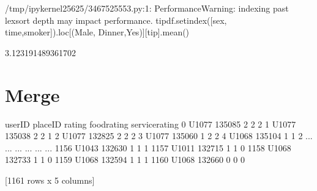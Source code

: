 \documentclass[letterpaper,10pt,english]{jupyterBook}
\begin{document}
\begin{sphinxVerbatim}[commandchars=\\\{\}]
/tmp/ipykernel\PYGZus{}25625/3467525553.py:1: PerformanceWarning: indexing past lexsort depth may impact performance.
  tip\PYGZus{}df.set\PYGZus{}index([\PYGZsq{}sex\PYGZsq{}, \PYGZsq{}time\PYGZsq{},\PYGZsq{}smoker\PYGZsq{}]).loc[(\PYGZsq{}Male\PYGZsq{}, \PYGZsq{}Dinner\PYGZsq{},\PYGZsq{}Yes\PYGZsq{})][\PYGZsq{}tip\PYGZsq{}].mean()
\end{sphinxVerbatim}

\begin{sphinxVerbatim}[commandchars=\\\{\}]
3.123191489361702
\end{sphinxVerbatim}


\chapter{Merge}
\label{\detokenize{c3_data_preprocessing/merge:merge}}\label{\detokenize{c3_data_preprocessing/merge::doc}}
\sphinxAtStartPar
{}

\begin{sphinxVerbatim}[commandchars=\\\{\}]
   
\end{sphinxVerbatim}

\begin{sphinxVerbatim}[commandchars=\\\{\}]
  
\end{sphinxVerbatim}

\begin{sphinxVerbatim}[commandchars=\\\{\}]
\end{sphinxVerbatim}

\begin{sphinxVerbatim}[commandchars=\\\{\}]
     userID  placeID  rating  food\PYGZus{}rating  service\PYGZus{}rating
0     U1077   135085       2            2               2
1     U1077   135038       2            2               1
2     U1077   132825       2            2               2
3     U1077   135060       1            2               2
4     U1068   135104       1            1               2
...     ...      ...     ...          ...             ...
1156  U1043   132630       1            1               1
1157  U1011   132715       1            1               0
1158  U1068   132733       1            1               0
1159  U1068   132594       1            1               1
1160  U1068   132660       0            0               0

[1161 rows x 5 columns]
\end{sphinxVerbatim}
\end{document}
